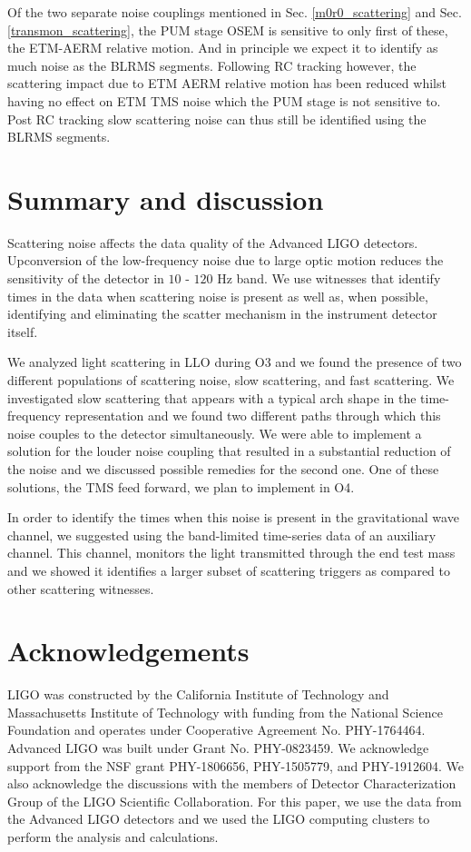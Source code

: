 \documentclass[12pt]{iopart}
\begin{document}
Of the two separate noise couplings mentioned in Sec. \ref{m0r0_scattering}  and Sec. \ref{transmon_scattering}, the PUM stage OSEM is sensitive to only first of these, the ETM-AERM relative motion. And in principle we expect it to identify as much noise as the BLRMS segments. Following RC tracking however, the scattering impact due to ETM AERM relative motion has been reduced whilst having no effect on ETM TMS noise which the PUM stage is not sensitive to. Post RC tracking slow scattering noise can thus still be identified using the BLRMS segments.



\newpage
\section{Summary and discussion}\label{summary}
 Scattering noise affects the data quality of the Advanced LIGO detectors. Upconversion of the low-frequency noise due to large optic motion reduces the sensitivity of the detector in $10$ - $120$ Hz band. We use witnesses that identify times in the data when scattering noise is present as well as, when possible, identifying and eliminating the scatter mechanism in the instrument detector itself. 

We analyzed light scattering in LLO during O3 and we found the presence of two different populations of scattering noise, slow scattering, and fast scattering. We investigated slow scattering that appears with a typical arch shape in the time-frequency representation and we found two different paths through which this noise couples to the detector simultaneously. We were able to implement a solution for the louder noise coupling that resulted in a substantial reduction of the noise and we discussed possible remedies for the second one. One of these solutions, the TMS feed forward, we plan to implement in O4.

In order to identify the times when this noise is present in the gravitational wave channel, we suggested using the band-limited time-series data of an auxiliary channel. This channel, monitors the light transmitted through the end test mass and we showed it identifies a larger subset of scattering triggers as compared to other scattering witnesses.
\par

\section{Acknowledgements} LIGO was constructed by the California Institute of Technology and Massachusetts Institute of Technology with funding from the National Science Foundation and operates under Cooperative Agreement No. PHY-1764464. Advanced LIGO was built under Grant No. PHY-0823459. We acknowledge support from the NSF grant PHY-1806656, PHY-1505779, and  PHY-1912604.  We also acknowledge the discussions with the members of Detector Characterization Group of the LIGO Scientific Collaboration. For this paper, we use the data from the Advanced LIGO detectors and we used the LIGO computing clusters to perform the analysis and calculations.
\end{document}
